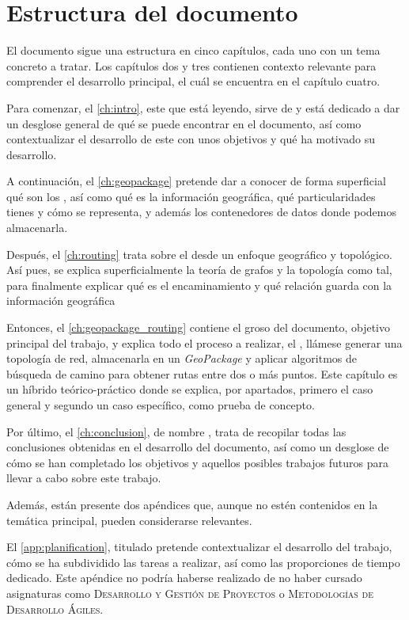 \section{Estructura del documento}	
	El documento sigue una estructura en cinco capítulos, cada uno con un tema concreto a tratar. Los capítulos dos y tres contienen contexto relevante para comprender el desarrollo principal, el cuál se encuentra en el capítulo cuatro.
	
	Para comenzar, el \autoref{ch:intro}, este que está leyendo, sirve de \textit{} y está dedicado a dar un desglose general de qué se puede encontrar en el documento, así como contextualizar el desarrollo de este con unos objetivos y qué ha motivado su desarrollo.
	
	A continuación, el \autoref{ch:geopackage} pretende dar a conocer de forma superficial qué son los \textit{}, así como qué es la información geográfica, qué particularidades tienes y cómo se representa, y además los contenedores de datos donde podemos almacenarla.
	
	Después, el \autoref{ch:routing} trata sobre el \textit{} desde un enfoque geográfico y topológico. Así pues, se explica superficialmente la teoría de grafos y la topología como tal, para finalmente explicar qué es el encaminamiento y qué relación guarda con la información geográfica
	
	Entonces, el \autoref{ch:geopackage_routing} contiene el groso del documento, objetivo principal del trabajo, y explica todo el proceso a realizar, el \textit{}, llámese generar una topología de red, almacenarla en un \textit{GeoPackage} y aplicar algoritmos de búsqueda de camino para obtener rutas entre dos o más puntos. Este capítulo es un híbrido teórico-práctico donde se explica, por apartados, primero el caso general y segundo un caso específico, como prueba de concepto. 
	
	Por último, el \autoref{ch:conclusion}, de nombre \textit{}, trata de recopilar todas las conclusiones obtenidas en el desarrollo del documento, así como un desglose de cómo se han completado los objetivos y aquellos posibles trabajos futuros para llevar a cabo sobre este trabajo.
	
	Además, están presente dos apéndices que, aunque no estén contenidos en la temática principal, pueden considerarse relevantes.
	
	El \autoref{app:planification}, titulado \textit{} pretende contextualizar el desarrollo del trabajo, cómo se ha subdividido las tareas a realizar, así como las proporciones de tiempo dedicado. Este apéndice no podría haberse realizado de no haber cursado asignaturas como \textsc{Desarrollo y Gestión de Proyectos} o \textsc{Metodologías de Desarrollo Ágiles}.
	
